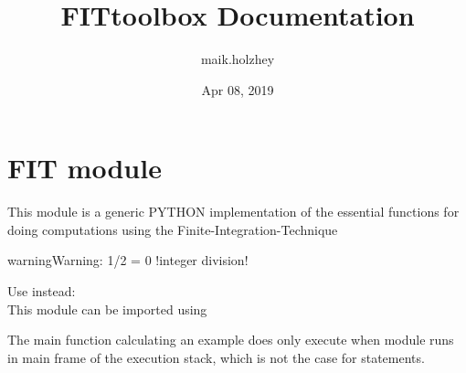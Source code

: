 \documentclass[letterpaper,10pt,english]{sphinxmanual}
\title{FITtoolbox Documentation}
\date{Apr 08, 2019}
\author{maik.holzhey}
\begin{document}
\pagestyle{empty}
\maketitle
\pagestyle{plain}
\sphinxtableofcontents
\pagestyle{normal}
\label{\detokenize{index::doc}}



\chapter{FIT module}
\label{\detokenize{FIT:module-FIT}}\label{\detokenize{FIT:fit-module}}\label{\detokenize{FIT::doc}}
This module is a generic PYTHON implementation of the essential functions for doing computations using the Finite-Integration-Technique

\begin{sphinxadmonition}{warning}{Warning:}
1/2 = 0 !integer division!
\end{sphinxadmonition}
\begin{description}
\item[{Use instead:}] \leavevmode
{}%
\begin{sphinxVerbatim}[commandchars=\\\{\}]
  
\end{sphinxVerbatim}

\item[{This module can be imported using}] \leavevmode
{}%
\begin{sphinxVerbatim}[commandchars=\\\{\}]
 
\end{sphinxVerbatim}

\end{description}

The main function calculating an example does only execute when module runs in main frame of the execution stack, which is not the case for  statements.
\end{document}
